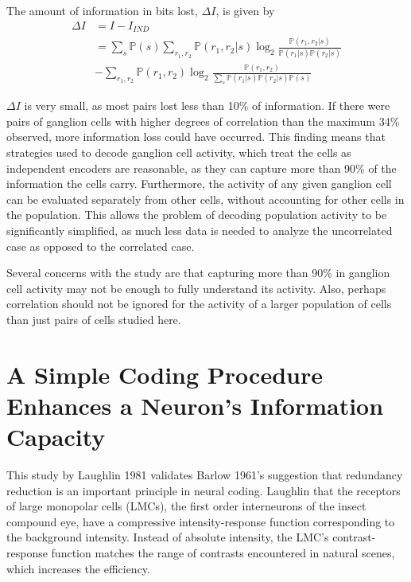 \documentclass[twoside]{article}
\begin{document}
\begin{multicols}{2}
The amount of information in bits lost, $\Delta I$, is given by 
\begin{align}
	\Delta I 
		&= I - I_{IND} \\
		&= \sum_s\mathbb{P}(s) \sum_{r_1,r_2}\mathbb{P}(r_1,r_2|s) \log_2 \frac{\mathbb{P}(r_1,r_2|s)}{\mathbb{P}(r_1|s)\mathbb{P}(r_2|s)} \\
		&- \sum_{r_1,r_2}\mathbb{P}(r_1,r_2) \log_2 \frac{\mathbb{P}(r_1,r_2)}{\sum_s \mathbb{P}(r_1|s)\mathbb{P}(r_2|s) \mathbb{P}(s)} 
\end{align}

$\Delta I$ is very small, as most pairs lost less than 10\% of information. If there were pairs of ganglion cells with higher degrees of correlation than the maximum 34\% observed, more information loss could have occurred. This finding means that strategies used to decode ganglion cell activity, which treat the cells as independent encoders are reasonable, as they can capture more than 90\% of the information the cells carry. Furthermore, the activity of any given ganglion cell can be evaluated separately from other cells, without accounting for other cells in the population. This allows the problem of decoding population activity to be significantly simplified, as much less data is needed to analyze the uncorrelated case as opposed to the correlated case. 

Several concerns with the study are that capturing more than 90\% in ganglion cell activity may not be enough to fully understand its activity. Also, perhaps correlation should not be ignored for the activity of a larger population of cells than just pairs of cells studied here. 








\section{A Simple Coding Procedure Enhances a Neuron's Information Capacity}

This study by Laughlin 1981 validates Barlow 1961's suggestion that redundancy reduction is an important principle in neural coding. Laughlin that the receptors of large monopolar cells (LMCs), the first order interneurons of the insect compound eye, have a compressive intensity-response function corresponding to the background intensity. Instead of absolute intensity, the LMC's contrast-response function matches the range of contrasts encountered in natural scenes, which increases the efficiency.


\end{multicols}
\end{document}
